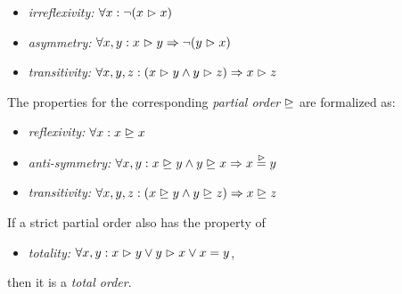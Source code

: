 \begin{itemize}
\item \emph{irreflexivity:} 
$\forall x: \neg (x \vartriangleright x)$

\item \emph{asymmetry:} 
$\forall x, y: x \vartriangleright y \Rightarrow \neg (y \vartriangleright x)$

\item \emph{transitivity:} 
$\forall x, y, z: (x \vartriangleright y \land y \vartriangleright z) \Rightarrow x \vartriangleright z$

\end{itemize}

\noindent
The properties for the corresponding \emph{partial order}
$\trianglerighteq$ are formalized as:
\begin{itemize}
\item \emph{reflexivity:} 
$\forall x: x \trianglerighteq x$

\item \emph{anti-symmetry:} 
$\forall x, y: x \trianglerighteq y \land y \trianglerighteq x \Rightarrow x \stackrel{\vartriangleright}{=} y$

\item \emph{transitivity:} 
$\forall x, y, z: (x \trianglerighteq y \land y \trianglerighteq z) \Rightarrow x \trianglerighteq z$
\end{itemize}

\pagebreak[3]
\noindent
If a strict partial order also has the property of

\begin{itemize}
\item \emph{totality:} $\forall x, y: x \vartriangleright y \lor y \vartriangleright x \lor x = y$,
\end{itemize}

\noindent
then it is a \emph{total order}.


